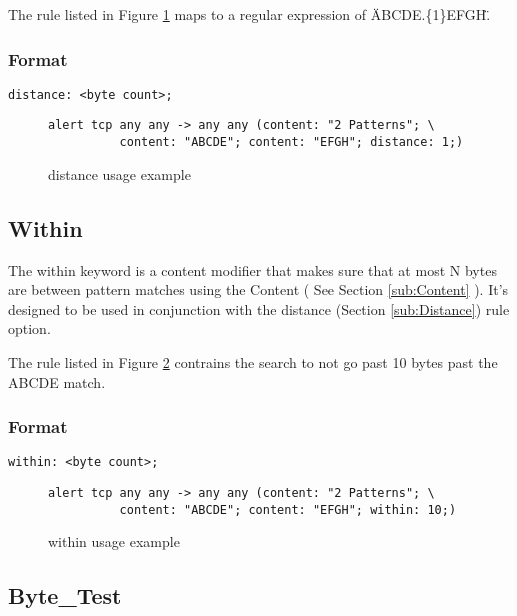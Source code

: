 \documentclass[english]{report}
\begin{document}
The rule listed in Figure \ref{fig:Distance} maps to a regular
expression of \"ABCDE.\{1\}EFGH\".

\subsubsection{Format}

\begin{verbatim}
distance: <byte count>;
\end{verbatim}

\begin{figure}[!hbpt]
\begin{verbatim}
alert tcp any any -> any any (content: "2 Patterns"; \
          content: "ABCDE"; content: "EFGH"; distance: 1;)
\end{verbatim}
\caption{distance usage example \label{fig:Distance}}
\end{figure}



\subsection{Within\label{sub:Within}}

The within keyword is a content modifier that makes sure that
at most N bytes are between pattern matches using the Content ( See
Section \ref{sub:Content} ).  It's designed to be used in conjunction
with the distance (Section \ref{sub:Distance}) rule option.

The rule listed in Figure \ref{fig:Within} contrains the search to not
go past 10 bytes past the ABCDE match. 

\subsubsection{Format}

\begin{verbatim}
within: <byte count>;
\end{verbatim}

\begin{figure}[!hbpt]
\begin{verbatim}
alert tcp any any -> any any (content: "2 Patterns"; \
          content: "ABCDE"; content: "EFGH"; within: 10;)
\end{verbatim}
\caption{within usage example \label{fig:Within}}
\end{figure}

\subsection{Byte\_Test\label{sub:Byte_Test}}
\end{document}
